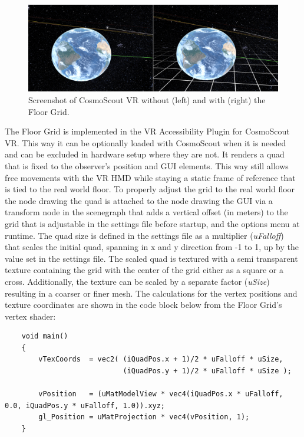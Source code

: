 \begin{figure}[h]
    \centering
    \includegraphics[width=\textwidth]{content/4_1_floorGrid/img/FloorGrid_Screenshot}
    \caption{Screenshot of CosmoScout VR without (left) and with (right) the Floor Grid.}
    \label{fig:floor-grid-screenshot}
\end{figure}
The Floor Grid is implemented in the VR Accessibility Plugin for CosmoScout VR\@.
This way it can be optionally loaded with CosmoScout when it is needed and can be excluded in hardware setup where
they are not.
It renders a quad that is fixed to the observer's position and GUI elements.
This way still allows free movements with the VR HMD while staying a static frame of reference that is tied to
the real world floor.
To properly adjust the grid to the real world floor the node drawing the quad is attached to the node drawing the GUI
via a transform node in the scenegraph that adds a vertical offset (in meters) to the grid that is adjustable in the
settings file before startup, and the options menu at runtime.
The quad size is defined in the settings file as a multiplier (\textit{uFalloff}) that scales
the initial quad, spanning in x and y direction from -1 to 1, up by the value set in the settings file.
The scaled quad is textured with a semi transparent texture containing the grid with the center of the grid either as a
square or a cross.
Additionally, the texture can be scaled by a separate factor (\textit{uSize}) resulting in a
coarser or finer mesh.
The calculations for the vertex positions and texture coordinates are shown in the code block below from the Floor
Grid's vertex shader:
\begin{verbatim}
    void main()
    {
        vTexCoords  = vec2( (iQuadPos.x + 1)/2 * uFalloff * uSize,
                            (iQuadPos.y + 1)/2 * uFalloff * uSize );

        vPosition   = (uMatModelView * vec4(iQuadPos.x * uFalloff, 0.0, iQuadPos.y * uFalloff, 1.0)).xyz;
        gl_Position = uMatProjection * vec4(vPosition, 1);
    }
\end{verbatim}
